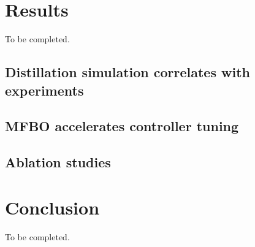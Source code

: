 

\section{Results}

To be completed.
\subsection{Distillation simulation correlates with experiments}



\subsection{MFBO accelerates controller tuning}





\subsection{Ablation studies}




\section{Conclusion}

To be completed.